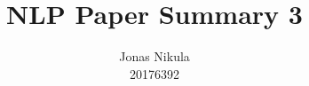 \documentclass{article}
\title{NLP Paper Summary 3} %
\author{Jonas Nikula \\ 20176392} %
\date{} %
\begin{document}
\maketitle %






\printbibliography{}

\end{document}
